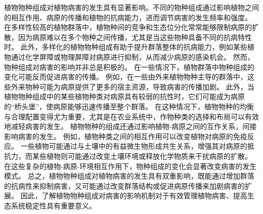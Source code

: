 \documentclass[AutoFakeBold]{LZUThesis-PgD&PhD}
\begin{document}
	
	植物物种组成对植物病害的发生具有显著影响。不同的物种组成通过影响植物之间的相互作用、病原的传播和植物的抗病能力，进而调节病害的发生频率和强度。
	在多样性较高的植物群落中，植物种间的竞争和生态位分化常常能够限制病原的扩散，因为病原难以在多个物种之间传播，尤其是当这些物种具备不同的抗病特性时\cite{Mitchell2002}。
	此外，多样化的植物物种组成有助于提升群落整体的抗病能力，例如某些植物通过化学屏障或物理屏障对病原进行抑制，从而减少病原的感染机会。
	然而，物种组成对病害的影响并非总是积极的。
	在一些情况下，植物群落中物种组成的变化可能反而促进病害的传播。
	例如，在一些由外来植物物种主导的群落中，这些外来物种可能为病原提供了更多的宿主资源，导致病害的传播加剧\cite{Garrett2006}。
	此外，当植物物种组成中的某些植物种类对病原具有较弱的抗性时，它们可能成为病原的“桥头堡”，使病原能够迅速传播至整个群落。
	在这种情况下，植物物种的均衡与合理配置变得尤为重要，尤其是在农业系统中，作物种类的选择和布局可以有效地减轻病害的发生。
	植物物种的组成还通过影响植物-病原之间的互作关系，间接影响病害的发生。
	例如，植物种类之间的相互作用可以改变植物对病原的免疫反应。
	一些植物可能通过与土壤中的有益微生物形成共生关系，增强其对病原的抵抗力，而某些植物则可能通过改变土壤环境或释放化学物质来干扰病原的扩散\cite{Bever2010}。
	在这些复杂的植物-病原-环境相互作用下，物种组成的变化会显著改变病害的发生模式。
	总之，植物物种组成对植物病害的发生具有双重影响，既能通过增加群落的抗病性来抑制病害，又可能通过改变群落结构或促进病原传播来加剧病害的扩展。
	因此，了解植物物种组成对病害的影响机制对于有效管理植物病害、提高生态系统稳定性具有重要意义\cite{Pautasso2010,Maron2011}。
	
	
\end{document}
